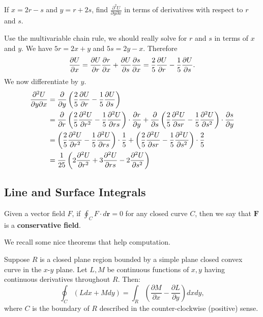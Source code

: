 \begin{exercise}
If $x=2r-s$ and $y=r+2s$, find $\frac{\partial^2 U}{\partial y \partial x}$
in terms of derivatives with respect to $r$ and $s$.
\end{exercise}
\begin{solution}
Use the multivariable chain rule, we should really solve for $r$ and $s$ in terms of $x$ and $y$.
We have $5r = 2x + y$ and $5s = 2y - x$. Therefore
\[
\frac{\partial U}{\partial x} = \frac{\partial U}{\partial r} \frac{\partial r}{\partial x} + \frac{\partial U}{\partial s} \frac{\partial s}{\partial x}
= \frac{2}{5} \frac{\partial U}{\partial r} - \frac{1}{5} \frac{\partial U}{\partial s}.
\]
We now differentiate by $y$.
\begin{align*}
\frac{\partial^2 U}{\partial y \partial x} &= \frac{\partial }{\partial y} \left(\frac{2}{5} \frac{\partial U}{\partial r} - \frac{1}{5} \frac{\partial U}{\partial s} \right) \\
&= \frac{\partial }{\partial r}\left(\frac{2}{5}\frac{\partial^2 U}{\partial r^2} - \frac{1}{5}\frac{\partial^2 U}{\partial rs}\right) \cdot \frac{\partial r}{\partial y}
+ \frac{\partial }{\partial s}\left(\frac{2}{5}\frac{\partial^2 U}{\partial sr} - \frac{1}{5}\frac{\partial^2 U}{\partial s^2}\right) \cdot \frac{\partial s}{\partial y} \\
&= \left(\frac{2}{5}\frac{\partial^2 U}{\partial r^2} - \frac{1}{5}\frac{\partial^2 U}{\partial rs}\right) \cdot \frac{1}{5}
+ \left(\frac{2}{5}\frac{\partial^2 U}{\partial sr} - \frac{1}{5}\frac{\partial^2 U}{\partial s^2}\right) \cdot \frac{2}{5} \\
&= \frac{1}{25} \left(2 \frac{\partial^2 U}{\partial r^2} + 3\frac{\partial^2 U}{\partial rs}
- 2\frac{\partial^2 U}{\partial s^2}\right)
\end{align*}
\end{solution}

\subsection{Line and Surface Integrals}

\begin{df}
Given a vector field $F$, if $\oint_{C} F \cdot d \textbf{r} = 0$ for any 
closed curve $C$, then we say that $\textbf{F}$ is a \textbf{conservative field}.
\end{df}

We recall some nice theorems that help computation.

\begin{theorem}
Suppose $R$ is a closed plane region bounded by a simple plane closed convex curve in the $x$-$y$ plane.
Let $L, M$ be continuous functions of $x, y$ having continuous derivatives throughout $R$. Then:
\[
\oint_C (L dx + M dy) = \int_R \left( \frac{\partial M}{\partial x} - \frac{\partial L}{\partial y} \right) dx dy,  
\]
where $C$ is the boundary of $R$ described in the counter-clockwise (positive) sense.
\end{theorem}

